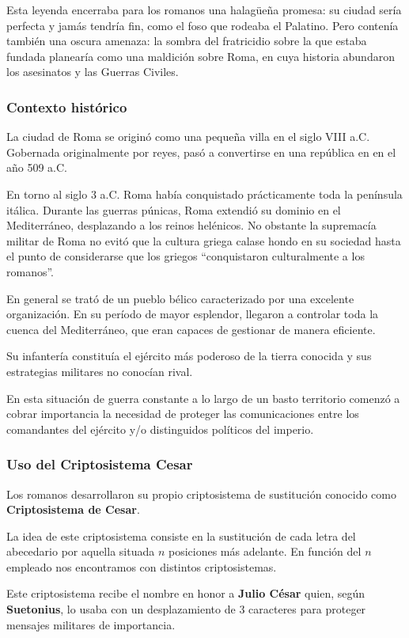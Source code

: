 \documentclass[nochap]{apuntesURJC}
\begin{document}
Esta leyenda encerraba para los romanos una halagüeña promesa: su ciudad sería perfecta y jamás tendría fin, como el foso que rodeaba el Palatino. Pero contenía también una oscura amenaza: la sombra del fratricidio sobre la que estaba fundada planearía como una maldición sobre Roma, en cuya historia abundaron los asesinatos y las Guerras Civiles.

\subsubsection{Contexto histórico}
La ciudad de Roma se originó como una pequeña villa en el siglo VIII a.C. Gobernada originalmente por reyes, pasó a convertirse en una república en en el año 509 a.C.

En torno al siglo 3 a.C. Roma había conquistado prácticamente toda la península itálica. Durante las guerras púnicas, Roma extendió su dominio en el Mediterráneo, desplazando a los reinos helénicos. No obstante la supremacía militar de Roma no evitó que la cultura griega calase hondo en su sociedad hasta el punto de considerarse que los griegos ``conquistaron culturalmente a los romanos''.

En general se trató de un pueblo bélico caracterizado por una excelente organización. En su período de mayor esplendor, llegaron a controlar toda la cuenca del Mediterráneo, que eran capaces de gestionar de manera eficiente.

Su infantería constituía el ejército más poderoso de la tierra conocida y sus estrategias militares no conocían rival.

En esta situación de guerra constante a lo largo de un basto territorio comenzó a cobrar importancia la necesidad de proteger las comunicaciones entre los comandantes del ejército y/o distinguidos políticos del imperio.

\subsubsection{Uso del Criptosistema Cesar}
Los romanos desarrollaron su propio criptosistema de sustitución conocido como \textbf{Criptosistema de Cesar}.

La idea de este criptosistema consiste en la sustitución de cada letra del abecedario por aquella situada $n$ posiciones más adelante. En función del $n$ empleado nos encontramos con distintos criptosistemas.

Este criptosistema recibe el nombre en honor a \textbf{Julio César} quien, según \textbf{Suetonius}, lo usaba con un desplazamiento de 3 caracteres para proteger mensajes militares de importancia.
\end{document}
